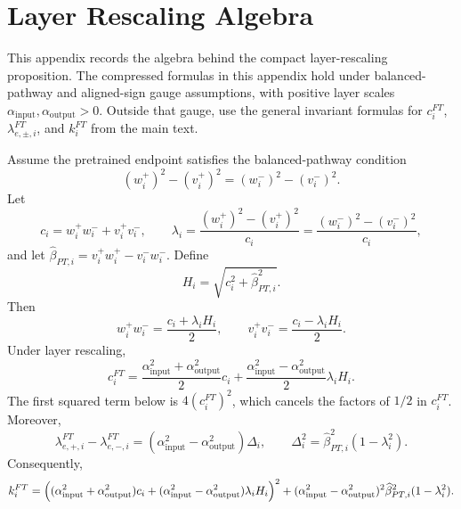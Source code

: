 \documentclass[11pt]{article}
\begin{document}
\section{Layer Rescaling Algebra}
\label{app:layer-rescaling}

This appendix records the algebra behind the compact layer-rescaling proposition. The compressed formulas in this appendix hold under balanced-pathway and aligned-sign gauge assumptions, with positive layer scales \(\alpha_{\mathrm{input}},\alpha_{\mathrm{output}}>0\). Outside that gauge, use the general invariant formulas for \(c_i^{FT}\), \(\lambda_{e,\pm,i}^{FT}\), and \(k_i^{FT}\) from the main text.

Assume the pretrained endpoint satisfies the balanced-pathway condition
\begin{equation}
    (w_i^+)^2-(v_i^+)^2=(w_i^-)^2-(v_i^-)^2.
\end{equation}
Let
\begin{equation}
    c_i=w_i^+w_i^-+v_i^+v_i^-,
    \qquad
    \lambda_i=\frac{(w_i^+)^2-(v_i^+)^2}{c_i}
    =
    \frac{(w_i^-)^2-(v_i^-)^2}{c_i},
\end{equation}
and let \(\widehat\beta_{PT,i}=v_i^+w_i^+-v_i^-w_i^-\). Define
\begin{equation}
    H_i=\sqrt{c_i^2+\widehat\beta_{PT,i}^2}.
\end{equation}
Then
\begin{equation}
    w_i^+w_i^- = \frac{c_i+\lambda_iH_i}{2},
    \qquad
    v_i^+v_i^- = \frac{c_i-\lambda_iH_i}{2}.
\end{equation}
Under layer rescaling,
\begin{equation}
    c_i^{FT}
    =
    \frac{\alpha_{\mathrm{input}}^2+\alpha_{\mathrm{output}}^2}{2}c_i
    +
    \frac{\alpha_{\mathrm{input}}^2-\alpha_{\mathrm{output}}^2}{2}\lambda_iH_i.
\end{equation}
The first squared term below is \(4(c_i^{FT})^2\), which cancels the factors of \(1/2\) in \(c_i^{FT}\).
Moreover,
\begin{equation}
    \lambda_{e,+,i}^{FT}-\lambda_{e,-,i}^{FT}
    =
    (\alpha_{\mathrm{input}}^2-\alpha_{\mathrm{output}}^2)\Delta_i,
    \qquad
    \Delta_i^2=\widehat\beta_{PT,i}^2(1-\lambda_i^2).
\end{equation}
Consequently,
\begin{equation}
\begin{split}
    k_i^{FT}
    =
    \Bigl(
        (\alpha_{\mathrm{input}}^2+\alpha_{\mathrm{output}}^2)c_i
        +
        (\alpha_{\mathrm{input}}^2-\alpha_{\mathrm{output}}^2)\lambda_iH_i
    \Bigr)^2
    +
    (\alpha_{\mathrm{input}}^2-\alpha_{\mathrm{output}}^2)^2
    \widehat\beta_{PT,i}^2(1-\lambda_i^2).
\end{split}
\end{equation}
\end{document}
